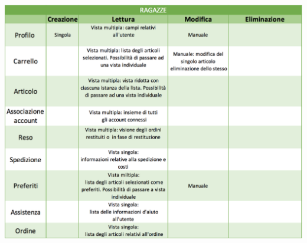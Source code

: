 \documentclass[12pt,a4paper]{report}
\begin{document}
\begin{center}
  \includegraphics[width=1\textwidth]{"Project Management Sources/StrutturaRagazze"}
\end{center}
\newpage
\end{document}
